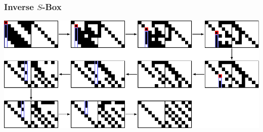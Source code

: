 %
%
%
\bgroup
\begin{frame}[t]
\setlength{\abovedisplayskip}{5pt}
\setlength{\belowdisplayskip}{5pt}
\frametitle{Inverse $S$-Box}
\begin{center}
\includegraphics[width=\textwidth]{../../buch/chapters/90-crypto/images/sbox.pdf}
\end{center}
\end{frame}
\egroup
